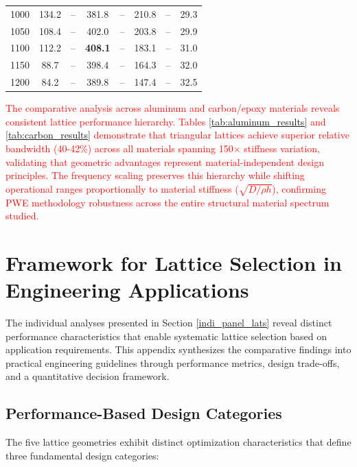 \documentclass[review,numbers,sort&compress]{elsarticle}
\begin{document}
{{\begin{table}[!htb]
\begin{tabular}{cccccccc}
1000 & 134.2 & -- & 381.8 & -- & 210.8 & -- & 29.3 \\
1050 & 108.4 & -- & 402.0 & -- & 203.8 & -- & 29.9 \\
1100 & 112.2 & -- & \textbf{408.1} & -- & 183.1 & -- & 31.0 \\
1150 & 88.7 & -- & 398.4 & -- & 164.3 & -- & 32.0 \\
1200 & 84.2 & -- & 389.8 & -- & 147.4 & -- & 32.5 \\
\hline
\end{tabular}
\end{table}}

\textcolor{red}{The comparative analysis across aluminum and carbon/epoxy materials reveals consistent lattice performance hierarchy. Tables \ref{tab:aluminum_results} and \ref{tab:carbon_results} demonstrate that triangular lattices achieve superior relative bandwidth (40-42\%) across all materials spanning 150× stiffness variation, validating that geometric advantages represent material-independent design principles. The frequency scaling preserves this hierarchy while shifting operational ranges proportionally to material stiffness ($\sqrt{D/\rho h}$), confirming PWE methodology robustness across the entire structural material spectrum studied.}

\newpage
\section{Framework for Lattice Selection in Engineering Applications}\label{selection_framework_appendix}

The individual analyses presented in Section \ref{indi_panel_lats} reveal distinct performance characteristics that enable systematic lattice selection based on application requirements. This appendix synthesizes the comparative findings into practical engineering guidelines through performance metrics, design trade-offs, and a quantitative decision framework.

\subsection{Performance-Based Design Categories}

The five lattice geometries exhibit distinct optimization characteristics that define three fundamental design categories:

}
\end{document}
